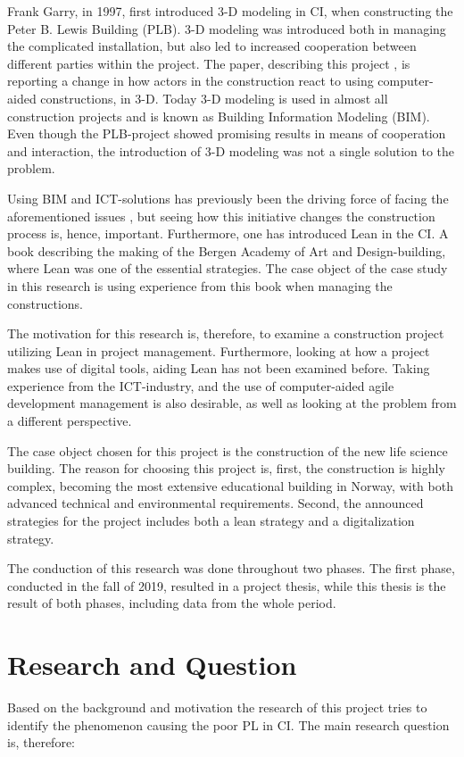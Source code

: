 Frank Garry, in 1997, first introduced 3-D modeling in CI, when constructing the Peter B. Lewis Building (PLB). 3-D modeling was introduced both in managing the complicated installation, but also led to increased cooperation between different parties within the project. The paper, describing this project \cite{frank_gehry}, is reporting a change in how actors in the construction react to using computer-aided constructions, in 3-D. Today 3-D modeling is used in almost all construction projects and is known as Building Information Modeling (BIM). Even though the PLB-project showed promising results in means of cooperation and interaction, the introduction of 3-D modeling was not a single solution to the problem. 
 
Using BIM and ICT-solutions has previously been the driving force of facing the aforementioned issues \cite{arayici2010building}, but seeing how this initiative changes the construction process is, hence, important. Furthermore, one has introduced Lean in the CI. A book \cite{lean_i_praksis} describing the making of the Bergen Academy of Art and Design-building, where Lean was one of the essential strategies. The case object of the case study in this research is using experience from this book when managing the constructions. 
 
The motivation for this research is, therefore, to examine a construction project utilizing Lean in project management. Furthermore, looking at how a project makes use of digital tools, aiding Lean has not been examined before. Taking experience from the ICT-industry, and the use of computer-aided agile development management is also desirable, as well as looking at the problem from a different perspective.
 
The case object chosen for this project is the construction of the new life science building. The reason for choosing this project is, first, the construction is highly complex, becoming the most extensive educational building in Norway, with both advanced technical and environmental requirements. Second, the announced strategies for the project includes both a lean strategy and a digitalization strategy. 

The conduction of this research was done throughout two phases. The first phase, conducted in the fall of 2019, resulted in a project thesis, while this thesis is the result of both phases, including data from the whole period.

\section{Research and Question} \label{sec:research}
Based on the background and motivation the research of this project tries to identify the phenomenon causing the poor PL in CI. The main research question is, therefore:

